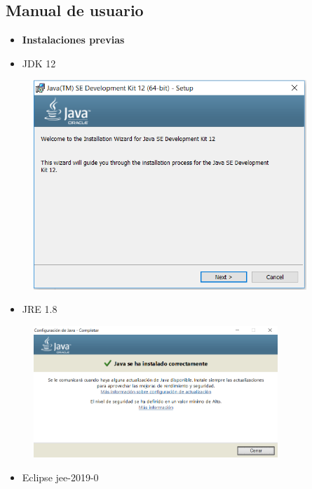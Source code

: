 \documentclass[a4paper,openright,14pt]{report}
\begin{document}
\subsection{Manual de usuario}
\begin{itemize}
\item \textbf{Instalaciones previas} 
\item JDK 12
\end{itemize}
\begin{figure}[htb]
\begin{center}
\includegraphics[width=10.3cm]{imagen2}
\end{center}
\end{figure}
\begin{itemize}
\item JRE 1.8
\end{itemize}
\begin{figure}[htb]
\begin{center}
\includegraphics[width=9.2cm]{imagen3}
\end{center}
\end{figure}
\newpage
\begin{itemize}
\item Eclipse jee-2019-0
\end{itemize}
\end{document}
